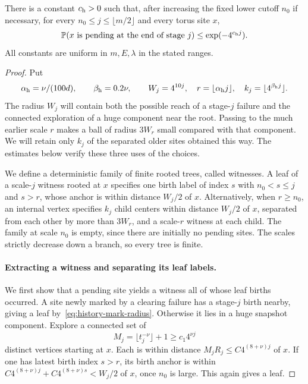 \begin{proposition}
\label{prop:witness-bound}
There is a constant $c_{\rm h}>0$ such that, after increasing the fixed lower
cutoff $n_0$ if necessary, for every $n_0\le j\le\lfloor m/2\rfloor$ and
every torus site $x$,
\[
 \mathbb P(x\text{ is pending at the end of stage }j)
 \le\exp(-4^{c_{\rm h}j}).
\]
All constants are uniform in $m,E,\lambda$ in the stated ranges.
\end{proposition}

\begin{proof}
Put
\[
 \alpha_{\rm h}=\nu/(100d),\qquad \beta_{\rm h}=0.2\nu,\qquad
 W_j=4^{10j},\quad r=\lfloor\alpha_{\rm h} j\rfloor,\quad
 k_j=\lfloor4^{\beta_{\rm h} j}\rfloor.
\]
The radius $W_j$ will contain both the possible reach of a stage-$j$
failure and the connected exploration of a huge component near the
root. Passing to the much earlier scale $r$ makes a ball of radius
$3W_r$ small compared with that component. We will retain only $k_j$
of the separated older sites obtained this way. The estimates below
verify these three uses of the choices.

We define a deterministic family of finite rooted trees, called witnesses.
A leaf of a scale-$j$ witness rooted at $x$ specifies one birth label of
index $s$ with $n_0<s\le j$ and $s>r$, whose anchor is within distance
$W_j/2$ of $x$.
Alternatively, when $r\ge n_0$, an internal vertex specifies $k_j$ child
centers within distance $W_j/2$ of $x$, separated from each other by more
than $3W_r$, and a scale-$r$ witness at each child.  The family at scale
$n_0$ is empty, since there are initially no pending sites.  The scales
strictly decrease down a branch, so every tree is finite.

\paragraph{Extracting a witness and separating its leaf labels.}
We first show that a pending site yields a witness all of whose leaf births
occurred.  A site newly marked by a clearing failure has a stage-$j$ birth
nearby, giving a leaf by~\eqref{eq:history-mark-radius}.  Otherwise it lies
in a huge snapshot component.  Explore a connected set of
\[
 M_j=\lfloor t_j^{-\nu}\rfloor+1\ge c_1 4^{\nu j}
\]
distinct vertices starting at $x$.  Each is within distance
$M_jR_j\le C4^{(8+\nu)j}$ of $x$.  If one has latest birth index $s>r$,
its birth anchor is within
$C4^{(8+\nu)j}+C4^{(8+\nu)s}<W_j/2$ of $x$, once $n_0$ is large.
This again gives a leaf.


\end{proof}
